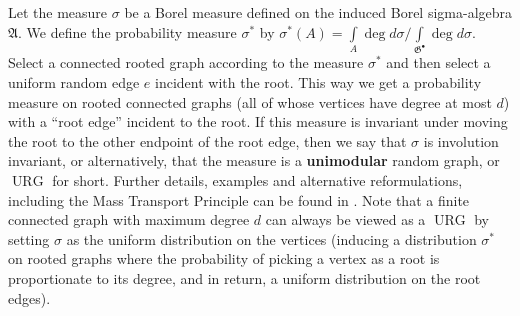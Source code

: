 \documentclass[12pt,a4paper]{article}
\renewcommand{\:}{\colon}
\DeclareMathOperator{\URG}{URG}
\begin{document}
Let the measure $\sigma$ be a Borel measure defined on the induced Borel sigma-algebra $\mathfrak{A}$. 
We define the probability measure $\sigma^*$ by $\sigma^*(A)=\int\limits_A \deg d\sigma / \int\limits_{\mathfrak{G}^\bullet} \deg d\sigma$. 
Select a connected rooted graph according to the measure $\sigma^*$ and then select a uniform random edge $e$ incident with the root. 
This way we get a probability measure on rooted connected graphs (all of whose vertices have degree at most $d$) with a ``root edge'' incident to the root. 
If this measure is invariant under moving the root to the other endpoint of the root edge, then we say that $\sigma$ is involution invariant, or alternatively, that the measure is a \textbf{unimodular} random graph, or $\URG$ for short. 
Further details, examples and alternative reformulations, including the Mass Transport Principle can be found in \cite{Lovaszbook}. 
Note that a finite connected graph with maximum degree $d$ can always be viewed as a $\URG$ by setting $\sigma$ as the uniform distribution on the vertices (inducing a distribution $\sigma^*$ on rooted graphs where the probability of picking a vertex as a root is proportionate to its degree, and in return, a uniform distribution on the root edges).
\end{document}
